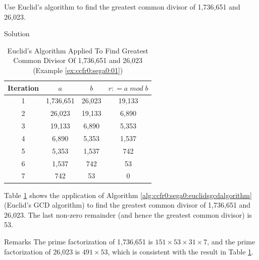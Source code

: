 \begin{vworkexamplestatement}
\label{ex:ccfr0:sega0:01}
Use Euclid's algorithm to find the greatest common divisor
of 1,736,651 and 26,023.
\end{vworkexamplestatement}
\begin{vworkexampleparsection}{Solution}
\begin{table}
\caption{Euclid's Algorithm Applied To Find Greatest Common Divisor Of 1,736,651 and 26,023 
         (Example \ref{ex:ccfr0:sega0:01})}
\label{tbl:ex:ccfr0:sega0:01}
\begin{center}
\begin{tabular}{|c|c|c|c|}
\hline
\small{Iteration} & \small{$a$}  & \small{$b$} & \small{$r : = a \; mod \; b$}        \\
\hline
\hline
\small{1}    & \small{1,736,651}           & \small{26,023}          & \small{19,133} \\
\hline
\small{2}    &    \small{26,023}           & \small{19,133}          &  \small{6,890} \\
\hline
\small{3}    &    \small{19,133}           &  \small{6,890}          &  \small{5,353} \\
\hline
\small{4}    &     \small{6,890}           &  \small{5,353}          &  \small{1,537} \\
\hline
\small{5}    &     \small{5,353}           &  \small{1,537}          &    \small{742} \\
\hline
\small{6}    &     \small{1,537}           &    \small{742}          &     \small{53} \\
\hline
\small{7}    &       \small{742}           &     \small{53}          &      \small{0} \\
\hline
\end{tabular}
\end{center}
\end{table}
Table \ref{tbl:ex:ccfr0:sega0:01} shows the application of 
Algorithm \ref{alg:ccfr0:sega0:euclidsgcdalgorithm} (Euclid's
GCD algorithm) to find the greatest common divisor
of 1,736,651 and 26,023.  The last non-zero remainder (and hence
the greatest common divisor) is 53.
\end{vworkexampleparsection}
\begin{vworkexampleparsection}{Remarks}
The prime factorization of 1,736,651 is $151 \times 53 \times 31 \times 7$, and
the prime factorization of 26,023 is $491 \times 53$, which is consistent
with the result in Table \ref{tbl:ex:ccfr0:sega0:01}.
\end{vworkexampleparsection}
\vworkexamplefooter{}


